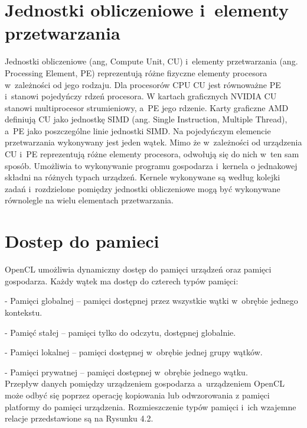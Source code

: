 \section{Jednostki obliczeniowe i~elementy przetwarzania}\label{sec:OpenC3L}

Jednostki obliczeniowe (ang, Compute Unit, CU) i~elementy przetwarzania (ang. Processing Element, PE) reprezentują różne fizyczne elementy procesora w~zależności od jego rodzaju. Dla procesorów CPU CU jest równoważne PE i~stanowi pojedyńczy rdzeń procesora. W kartach graficznych NVIDIA CU stanowi multiprocesor strumieniowy, a~PE jego rdzenie. Karty graficzne AMD definiują CU jako jednostkę SIMD (ang. Single Instruction, Multiple Thread), a~PE jako poszczególne linie jednostki SIMD. Na pojedyńczym elemencie przetwarzania wykonywany jest jeden wątek. Mimo że w~zależności od urządzenia CU i~PE reprezentują różne elementy procesora, odwołują się do nich w~ten sam sposób. Umożliwia to wykonywanie programu gospodarza i~kernela o jednakowej składni na różnych typach urządzeń. Kernele wykonywane są według kolejki zadań i~rozdzielone pomiędzy jednostki obliczeniowe mogą być wykonywane równolegle na wielu elementach przetwarzania.

\section{Dostep do pamieci}\label{sec:OpenC6L}

OpenCL umożliwia dynamiczny dostęp do pamięci urządzeń oraz pamięci gospodarza. Każdy wątek ma dostęp do czterech typów pamięci:

- Pamięci globalnej – pamięci dostępnej przez wszystkie wątki w~obrębie jednego kontekstu.

- Pamięć stałej – pamięci tylko do odczytu, dostępnej globalnie.

- Pamięci lokalnej – pamięci dostępnej w~obrębie jednej grupy wątków.

- Pamięci prywatnej – pamięci dostępnej w~obrębie jednego wątku.\\

Przepływ danych pomiędzy urządzeniem gospodarza a~urządzeniem OpenCL może odbyć się poprzez operację kopiowania  lub odwzorowania z pamięci platformy do pamięci urządzenia. Rozmieszczenie typów pamięci i~ich wzajemne relacje przedstawione są na Rysunku 4.2.

